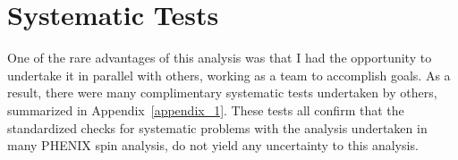 \clearpage
\section{Systematic Tests}

One of the rare advantages of this analysis was that I had the opportunity to
undertake it in parallel with others, working as a team to accomplish goals.  As
a result, there were many complimentary systematic tests undertaken by others,
summarized in Appendix~\ref{appendix_1}. These tests all confirm that the
standardized checks for systematic problems with the analysis undertaken in many
PHENIX spin analysis,  do not yield any uncertainty to this analysis.  
